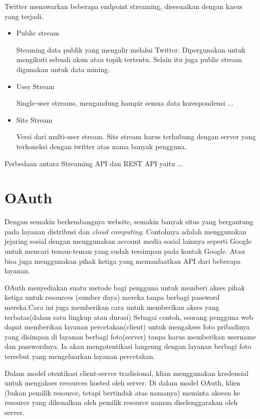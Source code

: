 Twitter menawarkan beberapa endpoint streaming, disesuaikan dengan kasus yang terjadi. 
\begin{itemize}
	\item Public stream
	
	Steaming data publik yang mengalir melalui Twitter. Dipergunakan untuk mengikuti sebuah akun atau topik tertentu. Selain itu juga public stream digunakan untuk data mining.
	\item User Stream
	
	Single-user streams, mengandung hampir semua data korespondensi ...
	
	\item Site Stream
	
	Versi dari multi-user stream. Site stream harus terhubung dengan server yang terkoneksi dengan twitter atas nama banyak pengguna.
\end{itemize}

Perbedaan antara Streaming API dan REST API yaitu ...

\section{OAuth}
\label{sec:oauth}
Dengan semakin berkembangnya website, semakin banyak situs yang bergantung pada layanan distribusi dan \textit{cloud computing}. Contohnya adalah menggunakan jejaring sosial dengan menggunakan account media sosial lainnya seperti Google untuk mencari teman-teman yang sudah tersimpan pada kontak Google. Atau bisa juga menggunakan pihak ketiga yang memanfaatkan API dari beberapa layanan.

OAuth menyediakan suatu metode bagi pengguna untuk memberi akses pihak ketiga untuk resources (sumber daya) mereka tanpa berbagi password mereka.Cara ini juga memberikan cara untuk memberikan akses yang terbatas(dalam satu lingkup atau durasi) Sebagai contoh, seorang pengguna web dapat memberikan layanan percetakan(client) untuk mengakses foto pribadinya yang disimpan di layanan berbagi foto(server) tanpa harus memberikan username dan passwordnya. Ia akan mengotentikasi langsung dengan layanan berbagi foto tersebut yang mengeluarkan layanan percetakan.

Dalam model otentikasi client-server tradisional, klian menggunakan kredensial untuk mengakses recources hosted oleh server. Di dalam model OAuth, klien (bukan pemilik resource, tetapi bertindak atas namanya) meminta aksesn ke resource yang dikenalkan oleh pemilik resource namun diselenggarakan oleh server.

